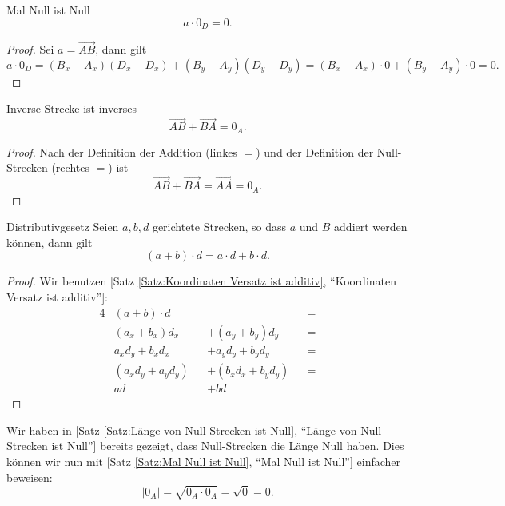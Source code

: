 \documentclass[a4paper]{amsart}
\theoremstyle{definition}
\newcommand{\myRef}[2]{[#1 \ref{#1:#2}, ``#2'']}
\begin{document}
\begin{Satz}{Mal Null ist Null}
   \begin{equation}
      a \cdot 0_D = 0.
   \end{equation}
\end{Satz}
\begin{proof}
   Sei $a = \overrightarrow{AB}$, dann gilt
   \begin{equation}
      a \cdot 0_D = (B_x-A_x)(D_x-D_x) + (B_y-A_y)(D_y-D_y) = (B_x-A_x) \cdot 0 + (B_y-A_y) \cdot 0 = 0.
   \end{equation}
\end{proof}

\begin{Satz}{Inverse Strecke ist inverses}
   \begin{equation}
      \overrightarrow{AB} + \overrightarrow{BA} = 0_A.
   \end{equation}
\end{Satz}
\begin{proof}
   Nach der Definition der Addition (linkes $=$) und der Definition der Null-Strecken (rechtes $=$) ist
   \begin{equation}
      \overrightarrow{AB} + \overrightarrow{BA} = \overrightarrow{AA} = 0_A.
   \end{equation}
\end{proof}

\begin{Satz}{Distributivgesetz}
   Seien $a, b, d$ gerichtete Strecken, so dass $a$ und $B$ addiert werden können, dann gilt
   \begin{equation}
      (a + b) \cdot d = a \cdot d + b \cdot d.
   \end{equation}
\end{Satz}
\begin{proof}
   Wir benutzen \myRef{Satz}{Koordinaten Versatz ist additiv}:
   \begin{alignat}{4}
      &(a+b) \cdot d && &&= \\
      &(a_x+b_x)d_x &&+ (a_y + b_y)d_y &&=\\
      &a_x d_y +b_xd_x &&+ a_y d_y + b_yd_y &&=\\
      &(a_x d_y +a_y d_y) &&+ (b_xd_x + b_y d_y) &&=\\
      &ad &&+ bd
   \end{alignat}
\end{proof}

Wir haben in \myRef{Satz}{Länge von Null-Strecken ist Null} bereits gezeigt, dass Null-Strecken die Länge Null haben. Dies können wir nun mit \myRef{Satz}{Mal Null ist Null} einfacher beweisen:
\begin{equation}
   |0_A| = \sqrt{0_A \cdot 0_A} = \sqrt 0 = 0.
\end{equation}
\end{document}
